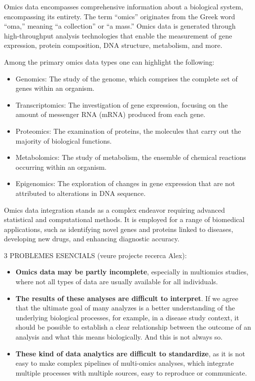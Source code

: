 \documentclass[a4paper, nobind]{templates/ociamthesis}
\providecommand{\tightlist}{%
  \setlength{\itemsep}{0pt}\setlength{\parskip}{0pt}}
\begin{document}
Omics data encompasses comprehensive information about a biological system, encompassing its entirety. The term ``omics'' originates from the Greek word ``oma,'' meaning ``a collection'' or ``a mass.'' Omics data is generated through high-throughput analysis technologies that enable the measurement of gene expression, protein composition, DNA structure, metabolism, and more.

Among the primary omics data types one can highlight the following:

\begin{itemize}
\tightlist
\item
  Genomics: The study of the genome, which comprises the complete set of genes within an organism.
\item
  Transcriptomics: The investigation of gene expression, focusing on the amount of messenger RNA (mRNA) produced from each gene.
\item
  Proteomics: The examination of proteins, the molecules that carry out the majority of biological functions.
\item
  Metabolomics: The study of metabolism, the ensemble of chemical reactions occurring within an organism.
\item
  Epigenomics: The exploration of changes in gene expression that are not attributed to alterations in DNA sequence.
\end{itemize}

Omics data integration stands as a complex endeavor requiring advanced statistical and computational methods. It is employed for a range of biomedical applications, such as identifying novel genes and proteins linked to diseases, developing new drugs, and enhancing diagnostic accuracy.

3 PROBLEMES ESENCIALS (veure projecte recerca Alex):

\begin{itemize}
\item
  \textbf{Omics data may be partly incomplete}, especially in multiomics studies, where not all types of data are usually available for all individuals.
\item
  \textbf{The results of these analyses are difficult to interpret}. If we agree that the ultimate goal of many analyzes is a better understanding of the underlying biological processes, for example, in a disease study context, it should be possible to establish a clear relationship between the outcome of an analysis and what this means biologically. And this is not always so.
\item
  \textbf{These kind of data analytics are difficult to standardize}, as it is not easy to make complex pipelines of multi-omics analyses, which integrate multiple processes with multiple sources, easy to reproduce or communicate.
\end{itemize}
\end{document}
